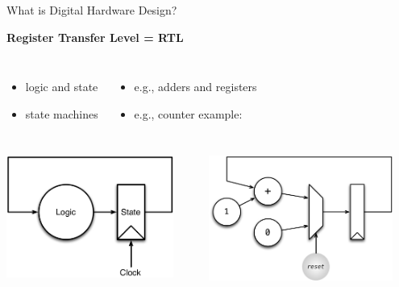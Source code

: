 \documentclass[xcolor=pdflatex,dvipsnames,table]{beamer}
\begin{document}
\begin{frame}[fragile]{What is Digital Hardware Design?}

{\bf Register Transfer Level = RTL}
\begin{columns}
\begin{itemize}
\item logic and state 
\item state machines
\end{itemize}
\begin{itemize}
\item e.g., adders and registers
\item e.g., counter example:
\end{itemize}
\end{columns}
\begin{columns}
\begin{center}
\includegraphics[width=0.9\textwidth]{figs/rtl.pdf} \\
\end{center}
\begin{center}
\includegraphics[width=0.9\textwidth]{figs/simple-counter.pdf} \\[0.5cm]
\end{center}
\end{columns}


\end{frame}
\end{document}
